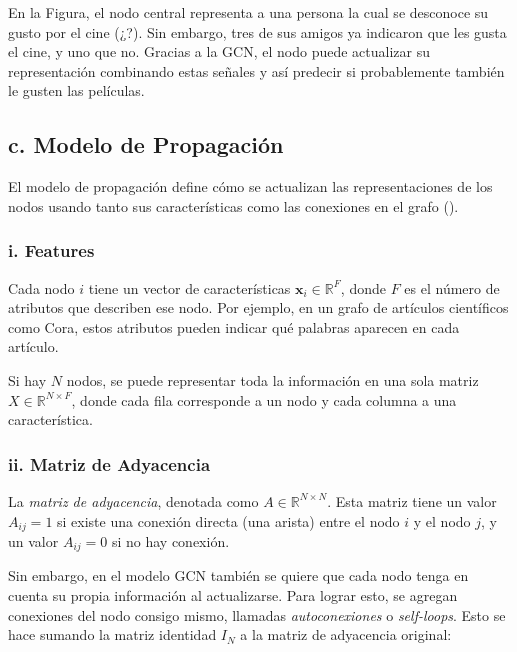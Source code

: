 \documentclass[11pt]{article} %
\begin{document}
\vspace{0.5em}
En la Figura, el nodo central representa a una persona la cual se desconoce su gusto por el cine (¿?). Sin embargo, tres de sus amigos ya indicaron que les gusta el cine, y uno que no. Gracias a la GCN, el nodo puede actualizar su representación combinando estas señales y así predecir si probablemente también le gusten las películas.




\subsection{c. Modelo de Propagación}

El modelo de propagación define cómo se actualizan las representaciones de los nodos usando tanto sus características como las conexiones en el grafo (\cite{kipf2016semi, hamilton2017inductive}).

\subsubsection{i. Features}

Cada nodo $i$ tiene un vector de características $\mathbf{x}_i \in \mathbb{R}^F$, donde $F$ es el número de atributos que describen ese nodo. Por ejemplo, en un grafo de artículos científicos como Cora, estos atributos pueden indicar qué palabras aparecen en cada artículo.

Si hay $N$ nodos, se puede representar toda la información en una sola matriz $X \in \mathbb{R}^{N \times F}$, donde cada fila corresponde a un nodo y cada columna a una característica.

\subsubsection{ii. Matriz de Adyacencia}

La \textit{matriz de adyacencia}, denotada como $A \in \mathbb{R}^{N \times N}$. Esta matriz tiene un valor $A_{ij} = 1$ si existe una conexión directa (una arista) entre el nodo $i$ y el nodo $j$, y un valor $A_{ij} = 0$ si no hay conexión.

Sin embargo, en el modelo GCN también se quiere que cada nodo tenga en cuenta su propia información al actualizarse. Para lograr esto, se agregan conexiones del nodo consigo mismo, llamadas \textit{autoconexiones} o \textit{self-loops}. Esto se hace sumando la matriz identidad $I_N$ a la matriz de adyacencia original:
\end{document}
